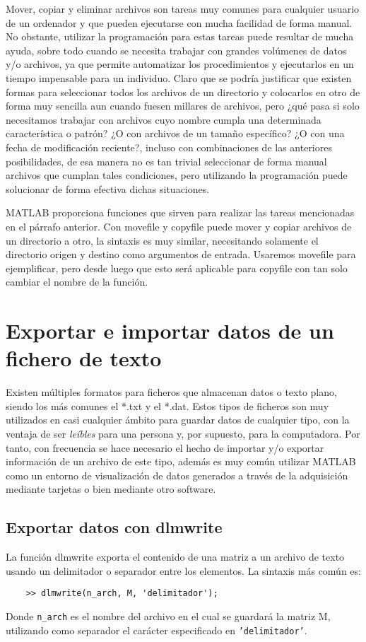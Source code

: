 Mover, copiar y eliminar archivos son tareas muy comunes para cualquier usuario  
de un ordenador y que pueden ejecutarse con mucha facilidad de forma manual. No 
obstante, utilizar la programación para estas tareas puede resultar de mucha ayuda, 
sobre todo cuando se necesita trabajar con grandes volúmenes de datos y/o archivos, 
ya que permite automatizar los procedimientos y ejecutarlos en un tiempo impensable 
para un individuo. Claro que se podría justificar que existen formas para seleccionar 
todos los archivos de un directorio y colocarlos en otro de forma muy sencilla  aun 
cuando fuesen millares de archivos, pero ¿qué pasa si solo necesitamos trabajar con 
archivos cuyo nombre cumpla una determinada característica o patrón? ¿O con archivos 
de un tamaño específico? ¿O con una fecha de modificación reciente?, incluso con 
combinaciones de las anteriores posibilidades, de esa manera no es tan trivial 
seleccionar de forma manual archivos que cumplan tales condiciones, pero utilizando 
la programación puede solucionar de forma efectiva dichas situaciones.

MATLAB proporciona funciones que sirven para realizar las tareas mencionadas en el 
párrafo anterior. Con movefile y copyfile puede mover y copiar archivos de un directorio 
a otro, la sintaxis es muy similar, necesitando solamente el directorio origen y destino 
como argumentos de entrada. Usaremos movefile para ejemplificar, pero desde luego que esto 
será aplicable para copyfile con tan solo cambiar el nombre de la función.

\section{Exportar e importar datos de un fichero de texto}

Existen múltiples formatos para ficheros que almacenan datos o texto plano, siendo los 
más comunes el *.txt y el *.dat. Estos tipos de ficheros son muy utilizados en casi 
cualquier ámbito para guardar datos de cualquier tipo, con la ventaja de ser \textit{leíbles}
para una persona y, por supuesto, para la computadora. Por tanto, con frecuencia se hace 
necesario el hecho de importar y/o exportar información de un archivo de este tipo, además 
es muy común utilizar MATLAB como un entorno de visualización de datos generados a través 
de la adquisición mediante tarjetas o bien mediante otro software.

\subsection{Exportar datos con dlmwrite}

La función dlmwrite exporta el contenido de una matriz a un archivo de texto usando 
un delimitador o separador entre los elementos. La sintaxis más común es:

\begin{verbatim}
	>> dlmwrite(n_arch, M, 'delimitador');
\end{verbatim}

Donde \texttt{n\_arch} es el nombre del archivo en el cual se guardará la matriz M, utilizando 
como separador el carácter especificado en \texttt{'delimitador'}.